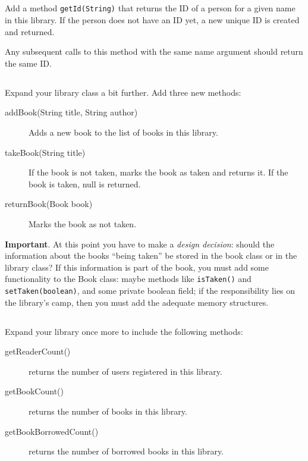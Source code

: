 \documentclass{article}
\begin{document}
\subsection{}

Add a method \verb+getId(String)+ that returns the ID of a person for
a given name in this library. If the person does not have an ID yet,
a new unique ID is created and returned. 

Any subsequent calls to this
method with the same name argument should return the same ID. 

\subsection{}

Expand your library class a bit further. Add three new methods: 

\begin{description}
\item[addBook(String title, String author)] Adds a new book to the
  list of books in this library.
\item[takeBook(String title)] If the book is not taken, marks the book
  as taken and returns it. If the book is taken, null is returned.
\item[returnBook(Book book)] Marks the book as not taken. 
\end{description}

\textbf{Important}. At this point you have to make a \emph{design
  decision}: should the information about the books ``being taken'' be
stored in the book class or in the library class? 
If this information is part of the book, you must
add some functionality to the Book class: maybe methods like
\verb+isTaken()+ and \verb+setTaken(boolean)+, and some private
boolean field; if the responsibility lies on the library's camp, then you must
add the adequate memory structures.

\subsection{}

Expand your library once more to include the following methods: 

\begin{description}
\item[getReaderCount()] returns the number of users registered in this
  library. 
\item[getBookCount()] returns the number of books in this library.
\item[getBookBorrowedCount()] returns the number of borrowed books in
  this library. 
\end{description}
\end{document}
